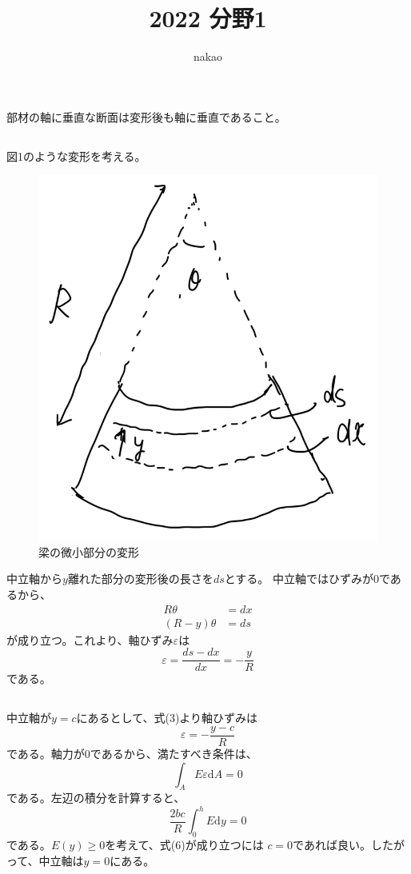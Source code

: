 \documentclass[a4paper]{jsarticle}
\begin{document}
\title{2022 分野1}
\author{nakao}
\maketitle

\section{}
\subsection{}
部材の軸に垂直な断面は変形後も軸に垂直であること。

\subsection{}
図1のような変形を考える。
\begin{figure}[hbt]
  \centering
  \includegraphics[width=0.3\hsize]{fig1.png}
  \caption{梁の微小部分の変形}
\end{figure}
中立軸から$y$離れた部分の変形後の長さを$ds$とする。
中立軸ではひずみが0であるから、
\begin{align}
  R \theta &= dx \\
  (R - y) \theta &= ds 
\end{align}
が成り立つ。これより、軸ひずみ$\varepsilon$は
\begin{equation}
  \varepsilon = \frac{ds - dx}{dx} = -\frac{y}{R}
\end{equation}
である。

\subsection{}
中立軸が$y = c$にあるとして、式(3)より軸ひずみは
\begin{equation}
  \varepsilon = -\frac{y - c}{R}
\end{equation}
である。軸力が0であるから、満たすべき条件は、
\begin{equation}
  \int_A E \varepsilon \mathrm{d} A = 0
\end{equation}
である。左辺の積分を計算すると、
\begin{equation}
  \frac{2 b c}{R} \int_0^h E \mathrm{d} y = 0
\end{equation}
である。$E(y) \geq 0$を考えて、式(6)が成り立つには
$c = 0$であれば良い。したがって、中立軸は$y = 0$にある。
\end{document}
